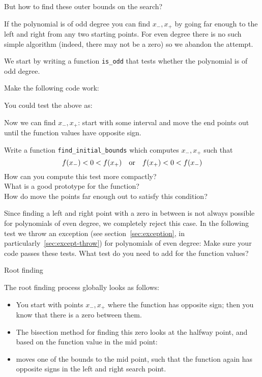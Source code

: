 But how to find these outer bounds on the search?

If the polynomial is of odd degree you can find $x_-,x_+$
by going far enough to the left and right
from any two starting points.
For even degree there is no such simple algorithm
(indeed, there may not be a zero)
so we abandon the attempt.

We start by writing a function \lstinline+is_odd+ that tests
whether the polynomial is of odd degree.

\begin{exercise}
  \label{ex:bisect-odd}
  Make the following code work:
\end{exercise}

You could test the above as:

Now we can find $x_-,x_+$: start with some interval
and move the end points out until the function values have opposite sign.

\begin{exercise}
  \label{ex:bisect-outer}
  Write a function \lstinline+find_initial_bounds+ which computes $x_-,x_+$
  such that
  \[ f(x_-)<0<f(x_+) \quad\hbox{or}\quad f(x_+)<0<f(x_-) \]
  How can you compute this test more compactly?\\
  What is a good prototype for the function?\\
  How do move the points far enough out to satisfy this condition?
\end{exercise}

Since finding a left and right point with a zero in between is not always
possible for polynomials of even degree, we completely reject this case.
In the following test we throw an exception
(see section~\ref{sec:exception}, in particularly~\ref{sec:except-throw})
for polynomials of even degree:
Make sure your code passes these tests.
What test do you need to add
for the function values?

 {Root finding}

The root finding process globally looks as follows:
\begin{itemize}
\item You start with points $x_-,x_+$ where the function has
  opposite sign; then you know that there is a zero between them.
\item 
  The bisection method for finding this zero
  looks at the halfway point, and based on the function value
  in the mid point:
\item moves one of the bounds to the mid point, such that the function
  again has opposite signs in the left and right search point.
\end{itemize}

